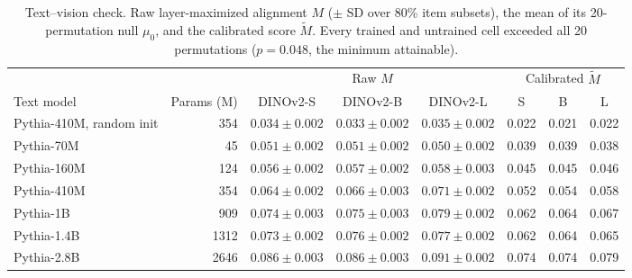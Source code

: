 \documentclass[11pt]{article}
\begin{document}
\begin{table}[t]
  \centering
  \small
  \caption{Text--vision check. Raw layer-maximized alignment $M$ ($\pm$ SD over 80\% item subsets), the mean of its 20-permutation null $\mu_0$, and the calibrated score $\tilde M$. Every trained and untrained cell exceeded all 20 permutations ($p=0.048$, the minimum attainable).}
  \label{tab:pythia}
  \footnotesize
  \setlength{\tabcolsep}{4pt}
  \begin{tabular}{lr ccc ccc}
    \toprule
    & & \multicolumn{3}{c}{Raw $M$} & \multicolumn{3}{c}{Calibrated $\tilde M$} \\
    \cmidrule(lr){3-5}\cmidrule(lr){6-8}
    Text model & Params (M) & DINOv2-S & DINOv2-B & DINOv2-L & S & B & L \\
    \midrule
    Pythia-410M, random init & 354 & $0.034 \pm 0.002$ & $0.033 \pm 0.002$ & $0.035 \pm 0.002$ & 0.022 & 0.021 & 0.022 \\
    \midrule
    Pythia-70M   & 45   & $0.051 \pm 0.002$ & $0.051 \pm 0.002$ & $0.050 \pm 0.002$ & 0.039 & 0.039 & 0.038 \\
    Pythia-160M  & 124  & $0.056 \pm 0.002$ & $0.057 \pm 0.002$ & $0.058 \pm 0.003$ & 0.045 & 0.045 & 0.046 \\
    Pythia-410M  & 354  & $0.064 \pm 0.002$ & $0.066 \pm 0.003$ & $0.071 \pm 0.002$ & 0.052 & 0.054 & 0.058 \\
    Pythia-1B    & 909  & $0.074 \pm 0.003$ & $0.075 \pm 0.003$ & $0.079 \pm 0.002$ & 0.062 & 0.064 & 0.067 \\
    Pythia-1.4B  & 1312 & $0.073 \pm 0.002$ & $0.076 \pm 0.002$ & $0.077 \pm 0.002$ & 0.062 & 0.064 & 0.065 \\
    Pythia-2.8B  & 2646 & $0.086 \pm 0.003$ & $0.086 \pm 0.003$ & $0.091 \pm 0.002$ & 0.074 & 0.074 & 0.079 \\
    \bottomrule
  \end{tabular}
\end{table}
\end{document}
